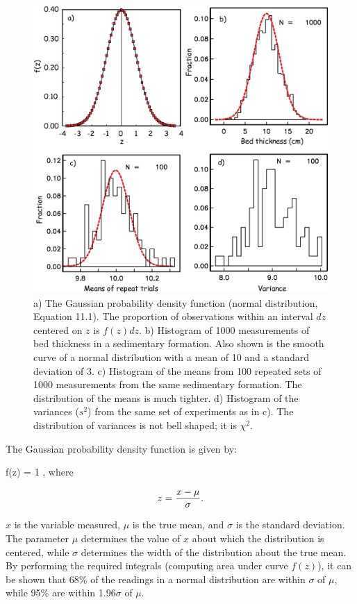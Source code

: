 \begin{figure}[h!tb]
\centering  \includegraphics[width= 13 cm]{EPSfiles/gauss.eps}
\caption{a) The Gaussian probability density function
(normal distribution, Equation 11.1). The
proportion of observations within an interval $dz$
centered on $ z$ is $f(z)dz$.
b) Histogram of 1000 measurements of bed thickness in a sedimentary
formation. Also shown is the smooth curve of a normal distribution 
with a mean of 10 and a standard deviation of 3.  c) Histogram of the means from 100 repeated sets of 1000 measurements from the same sedimentary formation.  The distribution of the means is much tighter.  d) Histogram of the  variances ($s^2$) from the same set of experiments as in c).  The distribution of variances is not bell shaped; it is $\chi^2$. }
\label{fig:gauss}
\end{figure}
\clearpage

The 
Gaussian probability density function  is given by:

\beq
{f(z)} = { 1\over{\sigma \sqrt{2\pi}}}{ },
\label{eq:normal}
\eeq
\noindent where

$$
z = { { x-\mu} \over {\sigma} }.
$$

\noindent
$x$ is the variable measured, $\mu$ is the true mean, and $\sigma$ is the standard deviation. The parameter $\mu$ determines
the value of $x$ about which the distribution is centered, while $\sigma$ determines the width of the distribution about
the true mean. By performing the required integrals (computing area under curve $f(z)$), it can be shown that
68\% of the readings in a normal distribution are within $\sigma$ of $\mu$, while 95\% are within 1.96$\sigma$ of $\mu$.

